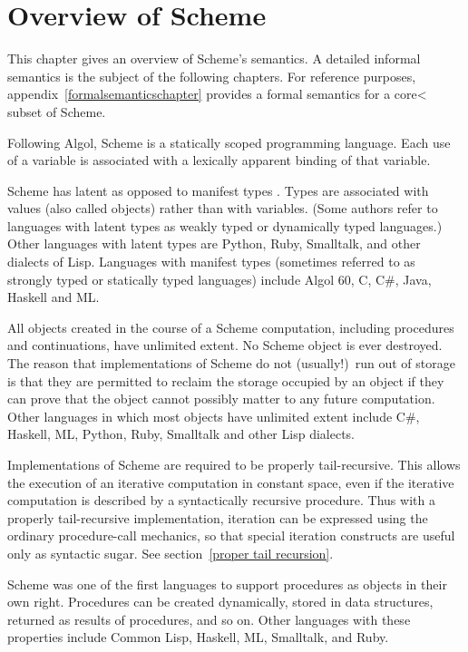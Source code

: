 
\chapter{Overview of Scheme}
\label{semanticchapter}

This chapter gives an overview of Scheme's semantics.  A
detailed informal semantics is the subject of
the following chapters.  For reference
purposes, appendix~\ref{formalsemanticschapter} provides a formal
semantics for a core< subset of Scheme.

\vest Following Algol, Scheme is a statically scoped programming
language.  Each use of a variable is associated with a lexically
apparent binding of that variable.

\vest Scheme has latent as opposed to manifest types
\cite{WaiteGoos}.  Types
are associated with values (also called objects) rather than
with variables.  (Some authors refer to languages with latent types as
weakly typed or dynamically typed languages.)  Other languages with
latent types are Python, Ruby, Smalltalk, and other dialects of Lisp.  Languages
with manifest types (sometimes referred to as strongly typed or
statically typed languages) include Algol 60, C, C\#, Java, Haskell and ML.

\vest All objects created in the course of a Scheme computation, including
procedures and continuations, have unlimited extent.
No Scheme object is ever destroyed.  The reason that
implementations of Scheme do not (usually!)\ run out of storage is that
they are permitted to reclaim the storage occupied by an object if
they can prove that the object cannot possibly matter to any future
computation.  Other languages in which most objects have unlimited
extent include C\#, Haskell, ML, Python, Ruby, Smalltalk and other Lisp dialects.

\vest Implementations of Scheme are required to be properly tail-recursive.
This allows the execution of an iterative computation in constant space,
even if the iterative computation is described by a syntactically
recursive procedure.  Thus with a properly tail-recursive implementation,
iteration can be expressed using the ordinary procedure-call
mechanics, so that special iteration constructs are useful only as
syntactic sugar.  See section~\ref{proper tail recursion}.

\vest Scheme was one of the first languages to support procedures as
objects in their own right.  Procedures can be created dynamically,
stored in data structures, returned as results of procedures, and so
on.  Other languages with these properties include Common Lisp,
Haskell, ML, Smalltalk, and Ruby.

